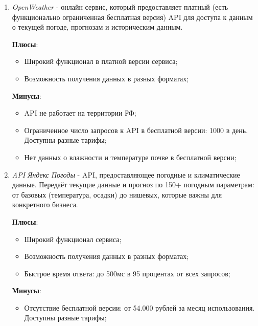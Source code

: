     \begin{enumerate}
        \item \textit{OpenWeather} \cite{openweather} - онлайн сервис, который предоставляет платный (есть функционально ограниченная бесплатная версия) API для доступа к данным о текущей погоде, прогнозам и историческим данным.  
        
        \textbf{Плюсы}:  
        \begin{itemize}
                \item Широкий функционал в платной версии сервиса;
                \item Возможность получения данных в разных форматах; 
        \end{itemize}
        
        \textbf{Минусы}:
        \begin{itemize}
                \item API не работает на территории РФ;
                \item Ограниченное число запросов к API в бесплатной версии: 1000 в день. Доступны разные тарифы;
                \item Нет данных о влажности и температуре почве в бесплатной версии;
        \end{itemize}

        \item \textit{API Яндекс Погоды} \cite{yandex_weather} -  API, предоставляющее погодные и климатические данные. Передаёт текущие данные и прогноз по 150+ погодным параметрам: от базовых (температура, осадки) до нишевых, которые важны для конкретного бизнеса.  
        
        \textbf{Плюсы}:  
        \begin{itemize}
                \item Широкий функционал сервиса;
                \item Возможность получения данных в разных форматах; 
                \item Быстрое время ответа: до 500мс в 95 процентах от всех запросов;
        \end{itemize}
        
        \textbf{Минусы}:
        \begin{itemize}
                \item Отсутствие бесплатной версии: от 54.000 рублей за месяц использования. Доступны разные тарифы;
        \end{itemize}


\end{enumerate}
